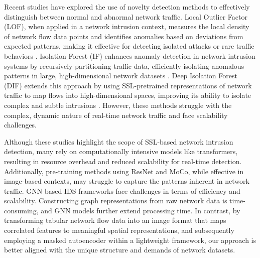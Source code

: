 Recent studies have explored the use of novelty detection methods to effectively distinguish between normal and abnormal network traffic. Local Outlier Factor (LOF), when applied in a network intrusion context, measures the local density of network flow data points and identifies anomalies based on deviations from expected patterns, making it effective for detecting isolated attacks or rare traffic behaviors \cite{alghushairy2020review}. Isolation Forest (IF) enhances anomaly detection in network intrusion systems by recursively partitioning traffic data, efficiently isolating anomalous patterns in large, high-dimensional network datasets \cite{al2021isolation}. Deep Isolation Forest (DIF) extends this approach by using SSL-pretrained representations of network traffic to map flows into high-dimensional spaces, improving its ability to isolate complex and subtle intrusions \cite{xu2023deep}. However, these methods struggle with the complex, dynamic nature of real-time network traffic and face scalability challenges.  

Although these studies highlight the scope of SSL-based network intrusion detection, many rely on computationally intensive models like transformers, resulting in resource overhead and reduced scalability for real-time detection. Additionally, pre-training methods using ResNet and MoCo, while effective in image-based contexts, may struggle to capture the patterns inherent in network traffic. GNN-based IDS frameworks face challenges in terms of efficiency and scalability. Constructing graph representations from raw network data is time-consuming, and GNN models further extend processing time. In contrast, by transforming tabular network flow data into an image format that maps correlated features to meaningful spatial representations, and subsequently employing a masked autoencoder within a lightweight framework, our approach is better aligned with the unique structure and demands of network datasets. 
